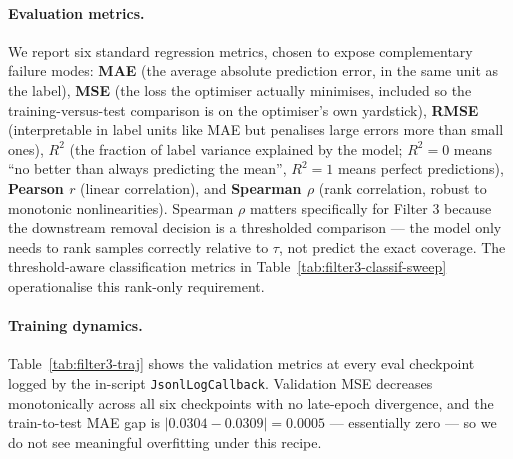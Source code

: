 \documentclass[acmlarge,nonacm,screen]{acmart}
\begin{document}
\paragraph{Evaluation metrics.}
We report six standard regression metrics, chosen to expose
complementary failure modes:
\textbf{MAE} (the average absolute prediction error, in the same
unit as the label),
\textbf{MSE} (the loss the optimiser actually minimises, included
so the training-versus-test comparison is on the optimiser's own
yardstick),
\textbf{RMSE} (interpretable in label units like MAE but penalises
large errors more than small ones),
\textbf{$R^2$} (the fraction of label variance explained by the
model; $R^2 = 0$ means ``no better than always predicting the
mean'', $R^2 = 1$ means perfect predictions),
\textbf{Pearson $r$} (linear correlation), and
\textbf{Spearman $\rho$} (rank correlation, robust to monotonic
nonlinearities). Spearman $\rho$ matters specifically for Filter 3
because the downstream removal decision is a thresholded comparison
--- the model only needs to rank samples correctly relative to
$\tau$, not predict the exact coverage. The threshold-aware
classification metrics in Table~\ref{tab:filter3-classif-sweep}
operationalise this rank-only requirement.

\paragraph{Training dynamics.} Table~\ref{tab:filter3-traj}
shows the validation metrics at every eval checkpoint logged by
the in-script \texttt{JsonlLogCallback}. Validation MSE decreases
monotonically across all six checkpoints with no late-epoch
divergence, and the train-to-test MAE gap is
$|0.0304 - 0.0309| = 0.0005$ --- essentially zero --- so we do not
see meaningful overfitting under this recipe.
\end{document}
